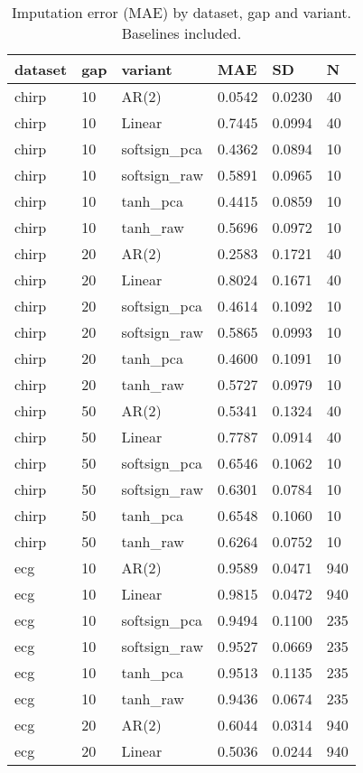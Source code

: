 \begin{table}[t]
\centering
\caption{Imputation error (MAE) by dataset, gap and variant. Baselines included.}
\label{tab:full_results}
\begin{tabular}{llllll}
\toprule
dataset & gap & variant & MAE & SD & N \\
\midrule
chirp & 10 & AR(2) & 0.0542 & 0.0230 & 40 \\
chirp & 10 & Linear & 0.7445 & 0.0994 & 40 \\
chirp & 10 & softsign_pca & 0.4362 & 0.0894 & 10 \\
chirp & 10 & softsign_raw & 0.5891 & 0.0965 & 10 \\
chirp & 10 & tanh_pca & 0.4415 & 0.0859 & 10 \\
chirp & 10 & tanh_raw & 0.5696 & 0.0972 & 10 \\
chirp & 20 & AR(2) & 0.2583 & 0.1721 & 40 \\
chirp & 20 & Linear & 0.8024 & 0.1671 & 40 \\
chirp & 20 & softsign_pca & 0.4614 & 0.1092 & 10 \\
chirp & 20 & softsign_raw & 0.5865 & 0.0993 & 10 \\
chirp & 20 & tanh_pca & 0.4600 & 0.1091 & 10 \\
chirp & 20 & tanh_raw & 0.5727 & 0.0979 & 10 \\
chirp & 50 & AR(2) & 0.5341 & 0.1324 & 40 \\
chirp & 50 & Linear & 0.7787 & 0.0914 & 40 \\
chirp & 50 & softsign_pca & 0.6546 & 0.1062 & 10 \\
chirp & 50 & softsign_raw & 0.6301 & 0.0784 & 10 \\
chirp & 50 & tanh_pca & 0.6548 & 0.1060 & 10 \\
chirp & 50 & tanh_raw & 0.6264 & 0.0752 & 10 \\
ecg & 10 & AR(2) & 0.9589 & 0.0471 & 940 \\
ecg & 10 & Linear & 0.9815 & 0.0472 & 940 \\
ecg & 10 & softsign_pca & 0.9494 & 0.1100 & 235 \\
ecg & 10 & softsign_raw & 0.9527 & 0.0669 & 235 \\
ecg & 10 & tanh_pca & 0.9513 & 0.1135 & 235 \\
ecg & 10 & tanh_raw & 0.9436 & 0.0674 & 235 \\
ecg & 20 & AR(2) & 0.6044 & 0.0314 & 940 \\
ecg & 20 & Linear & 0.5036 & 0.0244 & 940 \\

\end{tabular}
\end{table}
